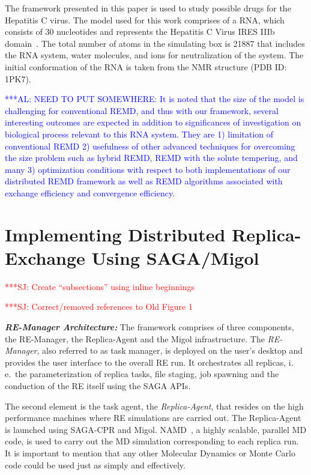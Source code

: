 \documentclass{rspublic}
\newcommand{\alnote}[1]{ {\textcolor{blue} { ***AL: #1 }}}
\newcommand{\jhanote}[1]{ {\textcolor{red} { ***SJ: #1 }}}
\newcommand{\alnote}[1]{}
\newcommand{\jhanote}[1]{}
\newcommand{\replicaagent}[1]{Replica-Agent }
\begin{document}
The framework presented in this paper is used to study possible
drugs for the Hepatitis C virus.  The model used for this work comprises of 
a RNA, which consists of 30 nucleotides and represents the Hepatitis C 
Virus IRES IIIb domain~\citep{Collier:2002wd}.  
The total number of atoms in the simulating box is 21887 that includes the 
RNA system, water molecules, and ions for neutralization of the system.  
The initial conformation of the RNA is taken from the NMR structure (PDB ID: 1PK7).    

\alnote{NEED TO PUT SOMEWHERE: It is noted that the size of the model is challenging for conventional REMD, 
and thus with our framework, several interesting outcomes are expected 
in addition to significances of investigation on biological process relevant 
to this RNA system. They are 1) limitation of conventional REMD 
2) usefulness of other advanced techniques for overcoming the size problem 
such as hybrid REMD, REMD with the solute tempering, and many  
3) optimization conditions with respect to both implementations of our 
distributed REMD framework as well as REMD algorithms associated with 
exchange efficiency and convergence efficiency.   
}

\section{Implementing Distributed Replica-Exchange Using SAGA/Migol}
\label{sec:remd_impl}

\jhanote{Create ``subsections'' using inline beginnings}

\jhanote{Correct/removed references to Old Figure 1}

{\it \bf RE-Manager Architecture:} The
framework comprises of three components, the RE-Man\-ag\-er,
the Replica-Agent and the Migol infrastructure. 
The  \emph{RE-Manager}, also referred to as task manager,
is deployed on the user's desktop and provides the user interface 
to the overall RE run. It orchestrates all replicas, i.\,e.\ the 
parameterization of replica  tasks, file staging, job spawning 
and the conduction of the RE itself using the SAGA APIs.                                                                

The second element is the task agent, the \textit{Replica-Agent},
that resides on the high performance machines where RE simulations
are carried out. The \replicaagent\ is launched using SAGA-CPR and Migol.
NAMD~\citep{Phillips:2005gd}, a highly scalable, parallel MD
code, is used to carry out the MD simulation corresponding to each
replica run. It is important to mention that any other Molecular Dynamics 
or Monte Carlo code could be used just as simply and effectively.
\end{document}
